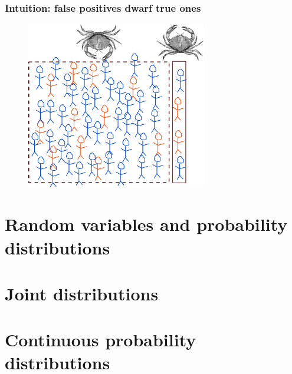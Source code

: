 \documentclass{beamer}
\begin{document}
	\begin{frame}
		\frametitle{Intuition: false positives dwarf true ones}
		
		\begin{figure}[ht]
			\includegraphics[width=0.7\textwidth]{./figures/breast_cancer_intuition.pdf}
		\end{figure}
		
		
	\end{frame}
	

	\section{Random variables and probability distributions}


	\section{Joint distributions}
	\frame{\tableofcontents[currentsection]}
	
	\section{Continuous probability distributions}
	\frame{\tableofcontents[currentsection]}
	
\end{document}
